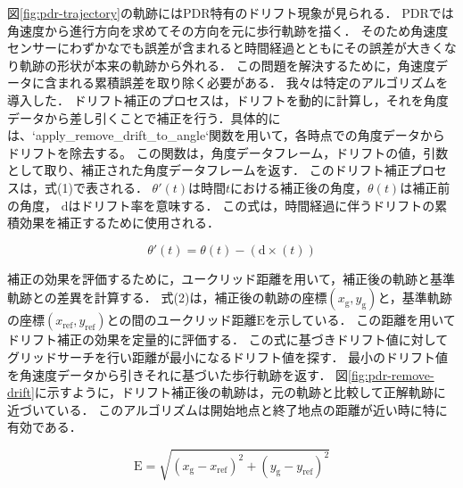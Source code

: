 \documentclass[Japanese]{dicomopapers}
\begin{document}
図\ref{fig:pdr-trajectory}の軌跡にはPDR特有のドリフト現象が見られる．
PDRでは角速度から進行方向を求めてその方向を元に歩行軌跡を描く．
そのため角速度センサーにわずかなでも誤差が含まれると時間経過とともにその誤差が大きくなり軌跡の形状が本来の軌跡から外れる．
この問題を解決するために，角速度データに含まれる累積誤差を取り除く必要がある．
我々は特定のアルゴリズムを導入した．
ドリフト補正のプロセスは，ドリフトを動的に計算し，それを角度データから差し引くことで補正を行う．具体的には、`apply\_remove\_drift\_to\_angle`関数を用いて，各時点での角度データからドリフトを除去する。
この関数は，角度データフレーム，ドリフトの値，引数として取り、補正された角度データフレームを返す．
このドリフト補正プロセスは，式(1)で表される．
$\theta'(t)$は時間$t$における補正後の角度，$\theta(t)$は補正前の角度，
$\mathrm{d}$はドリフト率を意味する．
この式は，時間経過に伴うドリフトの累積効果を補正するために使用される．

\vspace{5mm} %

\begin{equation}
	\theta'(t) = \theta(t) - (\mathrm{d} \times (t))
\end{equation}

\vspace{5mm} %

補正の効果を評価するために，ユークリッド距離を用いて，補正後の軌跡と基準軌跡との差異を計算する．
式(2)は，補正後の軌跡の座標$(x_{\mathrm{g}}, y_{\mathrm{g}})$と，基準軌跡の座標$(x_{\mathrm{ref}}, y_{\mathrm{ref}})$との間のユークリッド距離$\mathrm{E}$を示している．
この距離を用いてドリフト補正の効果を定量的に評価する．
この式に基づきドリフト値に対してグリッドサーチを行い距離が最小になるドリフト値を探す．
最小のドリフト値を角速度データから引きそれに基づいた歩行軌跡を返す．
図\ref{fig:pdr-remove-drift}に示すように，ドリフト補正後の軌跡は，元の軌跡と比較して正解軌跡に近づいている．
このアルゴリズムは開始地点と終了地点の距離が近い時に特に有効である．

\vspace{5mm} %
\begin{equation}
	\mathrm{E} = \sqrt{(x_{\mathrm{g}} - x_{\mathrm{ref}})^2 + (y_{\mathrm{g}} - y_{\mathrm{ref}})^2}
\end{equation}
\vspace{5mm} %
\end{document}
